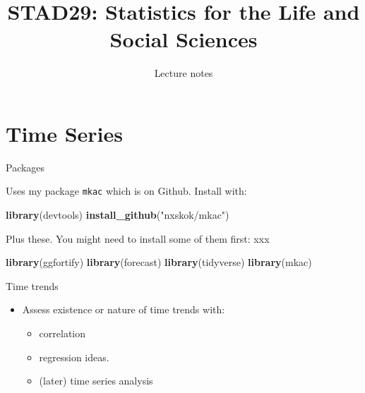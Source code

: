 \documentclass[ignorenonframetext,]{beamer}
\title{STAD29: Statistics for the Life and Social Sciences}
\author{Lecture notes}
\date{}
\newenvironment{Shaded}{\begin{snugshade}}{\end{snugshade}}
\newcommand{\KeywordTok}[1]{\textcolor[rgb]{0.13,0.29,0.53}{\textbf{#1}}}
\newcommand{\NormalTok}[1]{#1}
\newcommand{\StringTok}[1]{\textcolor[rgb]{0.31,0.60,0.02}{#1}}
\providecommand{\tightlist}{%
  \setlength{\itemsep}{0pt}\setlength{\parskip}{0pt}}
\begin{document}
\frame{\titlepage}

\hypertarget{time-series}{%
\section{Time Series}\label{time-series}}

\begin{frame}[fragile]{Packages}
\protect\hypertarget{packages}{}

Uses my package \texttt{mkac} which is on Github. Install with:

\begin{Shaded}
\begin{Highlighting}[]
\KeywordTok{library}\NormalTok{(devtools)}
\KeywordTok{install_github}\NormalTok{(}\StringTok{"nxskok/mkac"}\NormalTok{)}
\end{Highlighting}
\end{Shaded}

Plus these. You might need to install some of them first: xxx

\begin{Shaded}
\begin{Highlighting}[]
\KeywordTok{library}\NormalTok{(ggfortify)}
\KeywordTok{library}\NormalTok{(forecast)}
\KeywordTok{library}\NormalTok{(tidyverse)}
\KeywordTok{library}\NormalTok{(mkac) }
\end{Highlighting}
\end{Shaded}

\end{frame}

\begin{frame}{Time trends}
\protect\hypertarget{time-trends}{}

\begin{itemize}
\tightlist
\item
  Assess existence or nature of time trends with:

  \begin{itemize}
  \tightlist
  \item
    correlation
  \item
    regression ideas.
  \item
    (later) time series analysis
  \end{itemize}
\end{itemize}

\end{frame}
\end{document}
